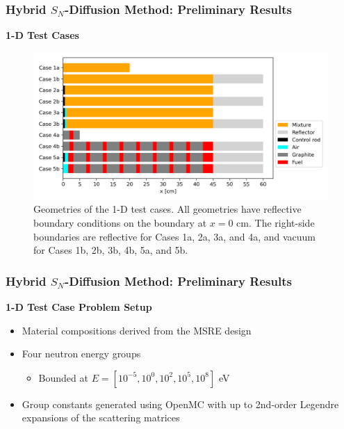 \begin{frame}
  \frametitle{Hybrid $S_N$-Diffusion Method: Preliminary Results}
  \textbf{1-D Test Cases}
  \begin{figure}[htb!]
    \centering
    \includegraphics[width=\columnwidth]{../images/case-geometry}
    \caption{Geometries of the 1-D test cases. All geometries
      have reflective boundary conditions on the boundary at $x=0$ cm. The right-side boundaries are
      reflective for Cases 1a, 2a, 3a, and 4a, and vacuum for Cases 1b, 2b, 3b, 4b, 5a, and 5b.}
    \label{fig:case-geom}
  \end{figure}
\end{frame}

\begin{frame}
  \frametitle{Hybrid $S_N$-Diffusion Method: Preliminary Results}
  \textbf{1-D Test Case Problem Setup}
  \begin{itemize}
    \item Material compositions derived from the MSRE design
    \item Four neutron energy groups
      \begin{itemize}
        \item Bounded at $E=[10^{-5}, 10^0, 10^2, 10^5, 10^8]$ eV
      \end{itemize}
    \item Group constants generated using OpenMC with up to 2nd-order Legendre expansions of the
      scattering matrices
  \end{itemize}
\end{frame}

